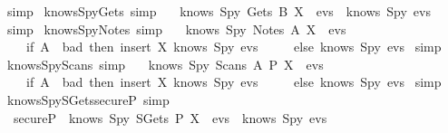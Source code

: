 \begin{isabellebody}
  \isadelimproof
  \endisadelimproof
  \isatagproof
  \isamarkupfalse%
  \ simp%
  \endisatagproof
  {\isafoldproof}%
  \isadelimproof
  \isanewline
  \endisadelimproof
  \isanewline
  \isamarkupfalse%
  \ knows{\isacharunderscore}Spy{\isacharunderscore}Gets\ {\isacharbrackleft}simp{\isacharbrackright}\ {\isacharcolon}\isanewline
  \ \ {\isachardoublequoteopen}knows\ Spy\ {\isacharparenleft}Gets\ B\ X\ {\isacharhash}\ evs{\isacharparenright}\ {\isacharequal}\ knows\ Spy\ evs{\isachardoublequoteclose}\isanewline
  \isadelimproof
  \endisadelimproof
  \isatagproof
  \isamarkupfalse%
  \ simp%
  \endisatagproof
  {\isafoldproof}%
  \isadelimproof
  \isanewline
  \endisadelimproof
  \isanewline
  \isamarkupfalse%
  \ knows{\isacharunderscore}Spy{\isacharunderscore}Notes\ {\isacharbrackleft}simp{\isacharbrackright}\ {\isacharcolon}\isanewline
  \ \ {\isachardoublequoteopen}knows\ Spy\ {\isacharparenleft}Notes\ A\ X\ {\isacharhash}\ evs{\isacharparenright}\ {\isacharequal}\isanewline
  \ \ \ \ {\isacharparenleft}if\ A\ {\isasymin}\ bad\ then\ insert\ X\ {\isacharparenleft}knows\ Spy\ evs{\isacharparenright}\isanewline
  \ \ \ \ \ else\ knows\ Spy\ evs{\isacharparenright}{\isachardoublequoteclose}\isanewline
  \isadelimproof
  \endisadelimproof
  \isatagproof
  \isamarkupfalse%
  \ simp%
  \endisatagproof
  {\isafoldproof}%
  \isadelimproof
  \isanewline
  \endisadelimproof
  \isanewline
  \isamarkupfalse%
  \ knows{\isacharunderscore}Spy{\isacharunderscore}Scans\ {\isacharbrackleft}simp{\isacharbrackright}\ {\isacharcolon}\isanewline
  \ \ {\isachardoublequoteopen}knows\ Spy\ {\isacharparenleft}Scans\ A\ P\ X\ {\isacharhash}\ evs{\isacharparenright}\ {\isacharequal}\isanewline
  \ \ \ \ {\isacharparenleft}if\ A\ {\isasymin}\ bad\ then\ insert\ X\ {\isacharparenleft}knows\ Spy\ evs{\isacharparenright}\isanewline
  \ \ \ \ \ else\ knows\ Spy\ evs{\isacharparenright}{\isachardoublequoteclose}\isanewline
  \isadelimproof
  \endisadelimproof
  \isatagproof
  \isamarkupfalse%
  \ simp%
  \endisatagproof
  {\isafoldproof}%
  \isadelimproof
  \isanewline
  \endisadelimproof
  \isanewline
  \isamarkupfalse%
  \ knows{\isacharunderscore}Spy{\isacharunderscore}SGets{\isacharunderscore}secureP\ {\isacharbrackleft}simp{\isacharbrackright}\ {\isacharcolon}\isanewline
  \ \ {\isachardoublequoteopen}secureP\ {\isasymLongrightarrow}\ knows\ Spy\ {\isacharparenleft}SGets\ P\ X\ {\isacharhash}\ evs{\isacharparenright}\ {\isacharequal}\ knows\ Spy\ evs{\isachardoublequoteclose}\isanewline

\end{isabellebody}
